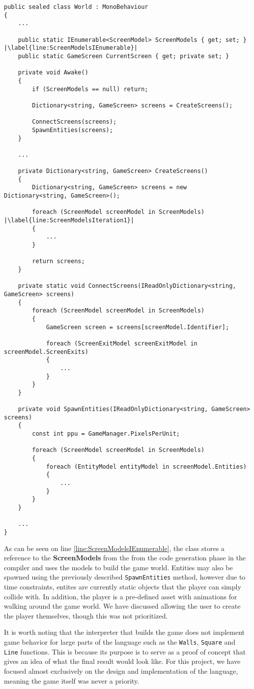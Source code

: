 \begin{lstlisting}[language=CSharp, caption={}, label={lst:WorldClassUnity},escapechar=|]
public sealed class World : MonoBehaviour
{
	...
    
    public static IEnumerable<ScreenModel> ScreenModels { get; set; } |\label{line:ScreenModelsIEnumerable}|
    public static GameScreen CurrentScreen { get; private set; }
    
    private void Awake()
    {
        if (ScreenModels == null) return;
        
        Dictionary<string, GameScreen> screens = CreateScreens();

        ConnectScreens(screens);
        SpawnEntities(screens);
    }

	...

    private Dictionary<string, GameScreen> CreateScreens()
    {
        Dictionary<string, GameScreen> screens = new Dictionary<string, GameScreen>();

        foreach (ScreenModel screenModel in ScreenModels) |\label{line:ScreenModelsIteration1}|
        {
			...
        }

        return screens;
    }

    private static void ConnectScreens(IReadOnlyDictionary<string, GameScreen> screens)
    {
        foreach (ScreenModel screenModel in ScreenModels) 
        {
            GameScreen screen = screens[screenModel.Identifier];

            foreach (ScreenExitModel screenExitModel in screenModel.ScreenExits)
            {
				...
            }
        }
    }

    private void SpawnEntities(IReadOnlyDictionary<string, GameScreen> screens)
    {
        const int ppu = GameManager.PixelsPerUnit;
        
        foreach (ScreenModel screenModel in ScreenModels)
        {
            foreach (EntityModel entityModel in screenModel.Entities)
            {
				...
            }
        }
    }
	
	...
}
\end{lstlisting}

As can be seen on line \ref{line:ScreenModelsIEnumerable}, the class stores a reference to the \textbf{ScreenModels} from the from the code generation phase in the compiler and uses the models to build the game world. 
Entities may also be spawned using the previously described \texttt{SpawnEntities} method, however due to time constraints, entites are currently static objects that the player can simply collide with. 
In addition, the player is a pre-defined asset with animations for walking around the game world. We have discussed allowing the user to create the player themselves, though this was not prioritized.


It is worth noting that the interpreter that builds the game does not implement game behavior for large parts of the \dazel{} language such as the \texttt{Walls}, \texttt{Square} and \texttt{Line} functions. 
This is because its purpose is to serve as a proof of concept that gives an idea of what the final result would look like. 
For this project, we have focused almost exclusively on the design and implementation of the \dazel{} language, meaning the game itself was never a priority.
